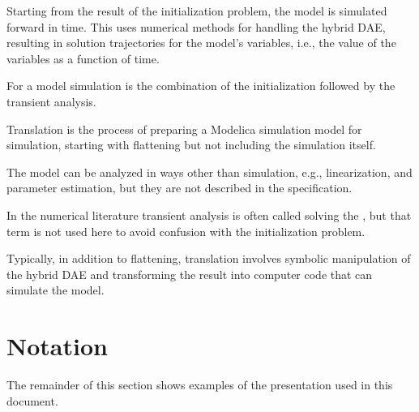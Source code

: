 \begin{definition}
Starting from the result of the initialization problem, the model is simulated forward in time.
This uses numerical methods for handling the hybrid DAE, resulting in solution trajectories for the model's variables, i.e., the value of the variables as a function of time.
\end{definition}

\begin{definition}[Simulation]
For a model simulation is the combination of the initialization followed by the transient analysis.
\end{definition}

\begin{definition}[Translation]
Translation is the process of preparing a Modelica simulation model for simulation, starting with flattening but not including the simulation itself.
\end{definition}

\begin{nonnormative}
The model can be analyzed in ways other than simulation, e.g., linearization, and parameter estimation, but they are not described in the specification.

In the numerical literature transient analysis is often called solving the , but that term is not used here to avoid confusion with the initialization problem.

Typically, in addition to flattening, translation involves symbolic manipulation of the hybrid DAE and transforming the result into computer code that can simulate the model.
\end{nonnormative}



\section{Notation}\label{notation}

The remainder of this section shows examples of the presentation used in this document.

